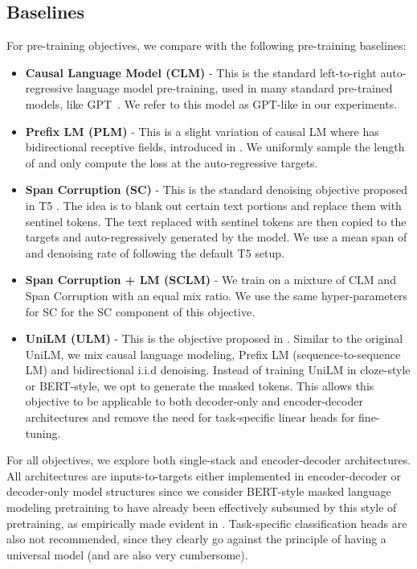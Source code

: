\documentclass[10pt]{article}
\begin{document}
\subsection{Baselines}
For pre-training objectives, we compare with the following pre-training baselines:
\begin{itemize}
    \item \textbf{Causal Language Model (CLM)} - This is the standard left-to-right auto-regressive language model pre-training, used in many standard pre-trained models, like GPT~\citep{Radford2019,brown2020language}. We refer to this model as GPT-like in our experiments.
    \item \textbf{Prefix LM (PLM)} - This is a slight variation of causal LM where  has bidirectional receptive fields, introduced in \citep{liu2018generating,raffel2019exploring}. We uniformly sample the length of  and only compute the loss at the auto-regressive targets. 
    \item \textbf{Span Corruption (SC)} - This is the standard denoising objective proposed in T5 \citep{raffel2019exploring}. The idea is to blank out certain text portions and replace them with sentinel tokens. The text replaced with sentinel tokens are then copied to the targets and auto-regressively generated by the model. We use a mean span of  and denoising rate of  following the default T5 setup.  
    \item \textbf{Span Corruption + LM (SCLM)} - We train on a mixture of CLM and Span Corruption with an equal mix ratio. We use the same hyper-parameters for SC for the SC component of this objective.
    \item \textbf{UniLM (ULM)} - This is the objective proposed in \citet{dong2019unified}. Similar to the original UniLM, we mix causal language modeling, Prefix LM (sequence-to-sequence LM) and bidirectional i.i.d denoising. Instead of training UniLM in cloze-style or BERT-style, we opt to generate the masked tokens.  This allows this objective to be applicable to both decoder-only and encoder-decoder architectures and remove the need for task-specific linear heads for fine-tuning. 
\end{itemize}
For all objectives, we explore both single-stack and encoder-decoder architectures. All architectures are inputs-to-targets either implemented in encoder-decoder or decoder-only model structures since we consider BERT-style masked language modeling pretraining to have already been effectively subsumed by this style of pretraining, as empirically made evident in \citep{raffel2019exploring}. Task-specific classification heads are also not recommended, since they clearly go against the principle of having a universal model (and are also very cumbersome).
\end{document}
